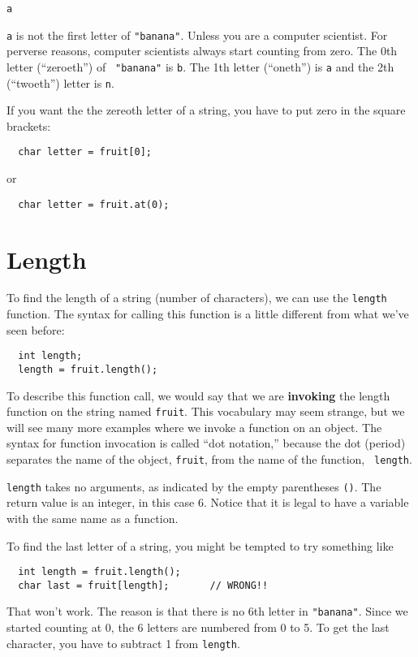\begin{verbatim}
a
\end{verbatim}
%
{\tt a} is not the first letter of {\tt "banana"}.  Unless you are a
computer scientist.  For perverse reasons, computer scientists always
start counting from zero.  The 0th letter (``zeroeth'') of {\tt
"banana"} is {\tt b}.  The 1th letter (``oneth'') is {\tt a} and the
2th (``twoeth'') letter is {\tt n}.

If you want the the zereoth letter of a string, you have to put
zero in the square brackets:

\begin{verbatim}
  char letter = fruit[0];
\end{verbatim}
or
\begin{verbatim}
  char letter = fruit.at(0);
\end{verbatim}

\section{Length}

To find the length of a string (number of characters), we can
use the {\tt length} function.  The syntax for calling this
function is a little different from what we've seen before:

\begin{verbatim}
  int length;
  length = fruit.length();
\end{verbatim}
%
To describe this function call, we would say that we are {\bf
invoking} the length function on the string named {\tt fruit}.  This
vocabulary may seem strange, but we will see many more examples where
we invoke a function on an object.  The syntax for function invocation
is called ``dot notation,'' because the dot (period) separates the
name of the object, {\tt fruit}, from the name of the function, {\tt
length}.

{\tt length} takes no arguments, as indicated by the empty parentheses
{\tt ()}.  The return value is an integer, in this case 6.  Notice
that it is legal to have a variable with the same name as a function.

To find the last letter of a string, you might be tempted to
try something like

\begin{verbatim}
  int length = fruit.length();
  char last = fruit[length];       // WRONG!!
\end{verbatim}
%
That won't work.  The reason is that there is no 6th letter
in {\tt "banana"}.  Since we started counting at 0, the 6
letters are numbered from 0 to 5.  To get the last character,
you have to subtract 1 from {\tt length}.


